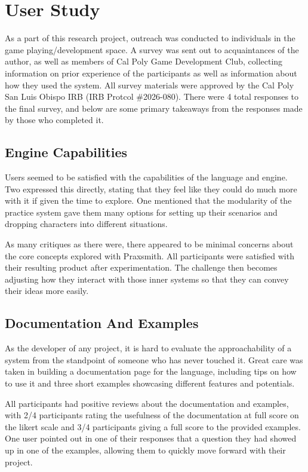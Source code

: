 \chapter{User Study} \label{sec:UserStudy}

As a part of this research project, outreach was conducted to individuals in the
game playing\slash development space. A survey was sent out to acquaintances of the
author, as well as members of Cal Poly Game Development Club, collecting information
on prior experience of the participants as well as information about how they used
the system. All survey materials were approved by the Cal Poly San Luis Obispo IRB
(IRB Protcol \#2026-080). There were 4 total responses to the final survey, and
below are some primary takeaways from the responses made by those who completed it.

\section{Engine Capabilities} \label{sec:EngineCapabilities}

Users seemed to be satisfied with the capabilities of the language and engine. Two
expressed this directly, stating that they feel like they could do much more with
it if given the time to explore. One mentioned that the modularity of the practice
system gave them many options for setting up their scenarios and dropping characters
into different situations.

As many critiques as there were, there appeared to be minimal concerns about the
core concepts explored with Praxsmith. All participants were satisfied with their
resulting product after experimentation. The challenge then becomes adjusting how
they interact with those inner systems so that they can convey their ideas more
easily.

\section{Documentation And Examples} \label{sec:DocumentationAndExamples}

As the developer of any project, it is hard to evaluate the approachability of a
system from the standpoint of someone who has never touched it. Great care was taken
in building a documentation page for the language, including tips on how to use it
and three short examples showcasing different features and potentials.

All participants had positive reviews about the documentation and examples, with
2\slash 4 participants rating the usefulness of the documentation at full score on the
likert scale and 3\slash 4 participants giving a full score to the provided examples.
One user pointed out in one of their responses that a question they had showed up
in one of the examples, allowing them to quickly move forward with their project.

